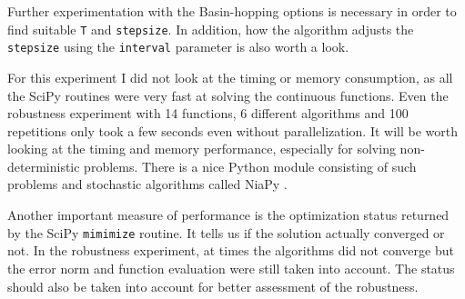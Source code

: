\documentclass[conference]{IEEEtran}
\begin{document}
Further experimentation with the Basin-hopping options is necessary in order to find suitable \texttt{T} and \texttt{stepsize}. In addition, how the algorithm adjusts the \texttt{stepsize} using the \texttt{interval} parameter is also worth a look.

For this experiment I did not look at the timing or memory consumption, as all the SciPy routines were very fast at solving the continuous functions. Even the robustness experiment with 14 functions, 6 different algorithms and 100 repetitions only took a few seconds even without parallelization. It will be worth looking at the timing and memory performance, especially for solving non-deterministic problems. There is a nice Python module consisting of such problems and stochastic algorithms called NiaPy \cite{b8}.

Another important measure of performance is the optimization status returned by the SciPy \texttt{mimimize} routine. It tells us if the solution actually converged or not. In the robustness experiment, at times the algorithms did not converge but the error norm and function evaluation were still taken into account. The status should also be taken into account for better assessment of the robustness.

\vfill
\pagebreak
\end{document}
